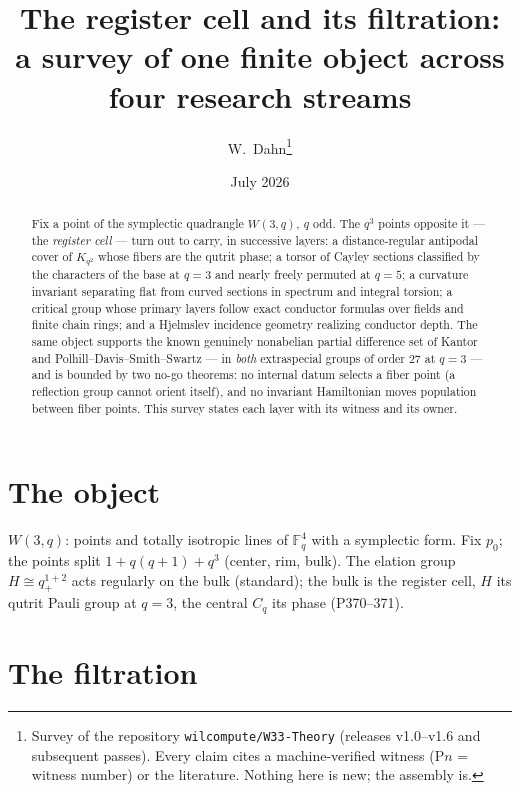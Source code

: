 \documentclass[11pt]{article}
\title{The register cell and its filtration:\\ a survey of one finite object
across four research streams}
\author{W.~Dahn\thanks{Survey of the repository \texttt{wilcompute/W33-Theory}
(releases v1.0--v1.6 and subsequent passes). Every claim cites a machine-verified
witness (P$n$ = witness number) or the literature. Nothing here is new; the
assembly is.}}
\date{July 2026}
\newcommand{\FF}{\mathbb F}
\begin{document}
\maketitle

\begin{abstract}
\noindent Fix a point of the symplectic quadrangle $W(3,q)$, $q$ odd. The
$q^3$ points opposite it --- the \emph{register cell} --- turn out to carry,
in successive layers: a distance-regular antipodal cover of $K_{q^2}$ whose
fibers are the qutrit phase; a torsor of Cayley sections classified by the
characters of the base at $q=3$ and nearly freely permuted at $q=5$; a
curvature invariant separating flat from curved sections in spectrum and
integral torsion; a critical group whose primary layers follow exact
conductor formulas over fields and finite chain rings; and a Hjelmslev
incidence geometry realizing conductor depth. The same object supports the
known genuinely nonabelian partial difference set of
Kantor and Polhill--Davis--Smith--Swartz --- in \emph{both} extraspecial
groups of order $27$ at $q=3$ --- and is bounded by two no-go theorems: no
internal datum selects a fiber point (a reflection group cannot orient
itself), and no invariant Hamiltonian moves population between fiber points.
This survey states each layer with its witness and its owner.
\end{abstract}

\section{The object}

$W(3,q)$: points and totally isotropic lines of $\FF_q^4$ with a symplectic
form. Fix $p_0$; the points split $1 + q(q+1) + q^3$ (center, rim, bulk). The
elation group $H\cong q^{1+2}_+$ acts regularly on the bulk (standard); the
bulk is the register cell, $H$ its qutrit Pauli group at $q=3$, the central
$C_q$ its phase (P370--371).

\section{The filtration}
\end{document}

